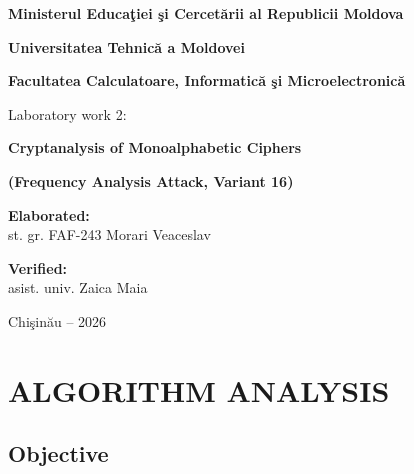 \documentclass[12pt,a4paper]{article}
\begin{document}
\begin{titlepage}
  \centering
  \vspace*{0.5cm}
  {\bfseries Ministerul Educaţiei şi Cercetării al Republicii Moldova\par}
  \vspace{0.25cm}
  {\bfseries Universitatea Tehnică a Moldovei\par}
  \vspace{0.25cm}
  {\bfseries Facultatea Calculatoare, Informatică şi Microelectronică\par}

  \vspace{4cm}
  {\LARGE Laboratory work 2:\par}
  \vspace{0.3cm}
  {\Large\bfseries Cryptanalysis of Monoalphabetic Ciphers\par}
  \vspace{0.2cm}
  {\large\bfseries (Frequency Analysis Attack, Variant 16)\par}

  \vspace{3cm}
  \hspace{4cm}
  \begin{minipage}{0.5\textwidth}
    \textbf{Elaborated:}\\
    st. gr. FAF-243 Morari Veaceslav

    \vspace{0.5cm}
    \textbf{Verified:}\\
    asist. univ. Zaica Maia
  \end{minipage}

  \vfill
  {\large Chişinău -- 2026\par}
\end{titlepage}

\tableofcontents
\newpage

\section{ALGORITHM ANALYSIS}

\subsection{Objective}
\end{document}
